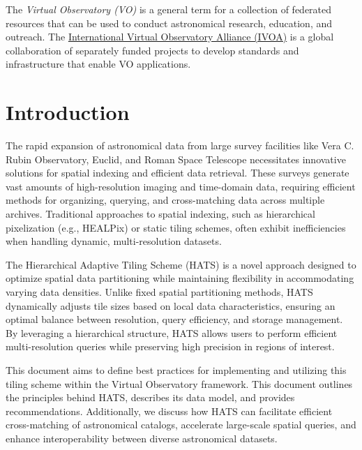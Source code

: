 \documentclass[11pt,a4paper]{ivoa}
\begin{document}
The \emph{Virtual Observatory (VO)} is a
general term for a collection of federated resources that can be used
to conduct astronomical research, education, and outreach.
The \href{https://www.ivoa.net}{International
Virtual Observatory Alliance (IVOA)} is a global
collaboration of separately funded projects to develop standards and
infrastructure that enable VO applications.

\section{Introduction}
    The rapid expansion of astronomical data from large survey facilities like Vera C. Rubin Observatory, Euclid, and Roman Space Telescope necessitates innovative solutions for spatial indexing and efficient data retrieval. These surveys generate vast amounts of high-resolution imaging and time-domain data, requiring efficient methods for organizing, querying, and cross-matching data across multiple archives. Traditional approaches to spatial indexing, such as hierarchical pixelization (e.g., HEALPix) or static tiling schemes, often exhibit inefficiencies when handling dynamic, multi-resolution datasets.

    The Hierarchical Adaptive Tiling Scheme (HATS) is a novel approach designed to optimize spatial data partitioning while maintaining flexibility in accommodating varying data densities. Unlike fixed spatial partitioning methods, HATS dynamically adjusts tile sizes based on local data characteristics, ensuring an optimal balance between resolution, query efficiency, and storage management. By leveraging a hierarchical structure, HATS allows users to perform efficient multi-resolution queries while preserving high precision in regions of interest.

    This document aims to define best practices for implementing and utilizing this tiling scheme within the Virtual Observatory framework. This document outlines the principles behind HATS, describes its data model, and provides recommendations. Additionally, we discuss how HATS can facilitate efficient cross-matching of astronomical catalogs, accelerate large-scale spatial queries, and enhance interoperability between diverse astronomical datasets.
\end{document}

